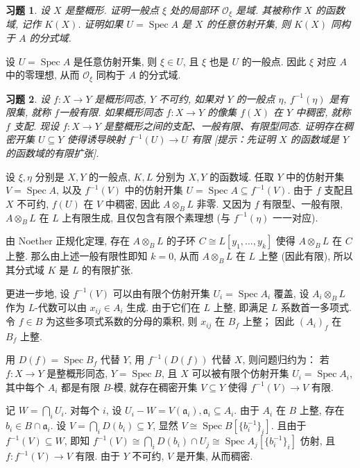 \documentclass{article}
\theoremstyle{exercise}
\newtheorem{exercise}{习题}[section]
\newenvironment{proofc}{\proof}{\endproof}
\def\ga{\mathfrak{a}}
\def\sO{\mathcal{O}}
\def\Spec{\operatorname{Spec}}
\begin{document}
\begin{exercise}
  设 $X$ 是整概形. 证明一般点 $\xi$ 处的局部环 $\sO_{\xi}$ 是域.
  其被称作 $X$ 的\emph{函数域}, 记作 $K(X)$.
  证明如果 $U = \Spec A$ 是 $X$ 的任意仿射开集, 则 $K(X)$ 同构于 $A$ 的分式域.
\end{exercise}

\begin{proofc}
  设 $U = \Spec A$ 是任意仿射开集, 则 $\xi \in U$, 且 $\xi$ 也是 $U$ 的一般点.
  因此 $\xi$ 对应 $A$ 中的零理想, 从而 $\sO_{\xi}$ 同构于 $A$ 的分式域.
\end{proofc}

\begin{exercise}
  设 $f \colon X \to Y$ 是概形同态, $Y$ 不可约,
  如果对 $Y$ 的一般点 $\eta$, $f^{-1}(\eta)$ 是有限集, 就称 $f$\emph{一般有限}.
  如果概形同态 $f \colon X \to Y$ 的像集 $f(X)$ 在 $Y$ 中稠密, 就称 $f$ \emph{支配}.
  现设 $f \colon X \to Y$ 是整概形之间的支配、一般有限、有限型同态.
  证明存在稠密开集 $U \subseteq Y$ 使得诱导映射 $f^{-1}(U) \to U$ 有限
  [\emph{提示：先证明 $X$ 的函数域是 $Y$ 的函数域的有限扩张}].
\end{exercise}

\begin{proofc}
  设 $\xi, \eta$ 分别是 $X, Y$ 的一般点, $K, L$ 分别为 $X, Y$ 的函数域.
  任取 $Y$ 中的仿射开集 $V = \Spec A$,
  以及 $f^{-1}(V)$ 中的仿射开集 $U = \Spec A \subseteq f^{-1}(V)$.
  由于 $f$ 支配且 $X$ 不可约, $f(U)$ 在 $V$ 中稠密,
  因此 $A \otimes_B L$ 非零.
  又因为 $f$ 有限型、一般有限, $A \otimes_B L$ 在 $L$ 上有限生成,
  且仅包含有限个素理想 (与 $f^{-1}(\eta)$ 一一对应).

  由 Noether 正规化定理, 存在 $A \otimes_B L$ 的子环 $C \cong L[y_1, \dots, y_k]$ 使得
  $A \otimes_B L$ 在 $C$ 上整. 那么由上述一般有限性即知 $k = 0$,
  从而 $A \otimes_B L$ 在 $L$ 上整 (因此有限), 所以其分式域 $K$ 是 $L$ 的有限扩张.

  更进一步地, 设 $f^{-1}(V)$ 可以由有限个仿射开集 $U_i = \Spec A_i$ 覆盖,
  设 $A_i \otimes_B L$ 作为 $L$-代数可以由 $x_{ij} \in A_i$ 生成.
  由于它们在 $L$ 上整, 即满足 $L$ 系数首一多项式.
  令 $f \in B$ 为这些多项式系数的分母的乘积, 则 $x_{ij}$ 在 $B_f$ 上整；
  因此 $(A_i)_f$ 在 $B_f$ 上整.

  用 $D(f) = \Spec B_f$ 代替 $Y$, 用 $f^{-1}(D(f))$ 代替 $X$,
  则问题归约为：
  若 $f \colon X \to Y$ 是整概形同态, $Y = \Spec B$,
  且 $X$ 可以被有限个仿射开集 $U_i = \Spec A_i$, 其中每个 $A_i$ 都是有限 $B$-模,
  就存在稠密开集 $V \subseteq Y$ 使得 $f^{-1}(V) \to V$ 有限.

  记 $W = \bigcap_i U_i$. 对每个 $i$, 设 $U_i - W = V(\ga_i), \ga_i \subseteq A_i$.
  由于 $A_i$ 在 $B$ 上整, 存在 $b_i \in B \cap \ga_i$.
  设 $V = \bigcap_i D(b_i) \subseteq Y$, 显然 $V \cong \Spec B[\{ b_i^{-1} \}_i]$.
  且由于 $f^{-1}(V) \subseteq W$,
  即知 $f^{-1}(V) \cong \bigcap_i D(b_i) \cap U_j \cong \Spec A_j[\{ b_i^{-1} \}_i]$
  仿射, 且 $f \colon f^{-1}(V) \to V$ 有限.
  由于 $Y$ 不可约, $V$ 是开集, 从而稠密.
\end{proofc}
\end{document}
